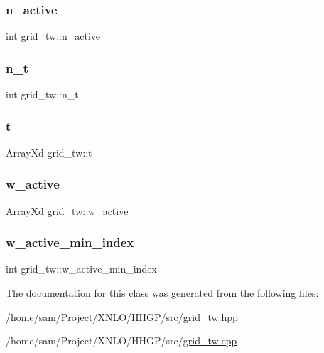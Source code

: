 \subsubsection{\texorpdfstring{n\+\_\+active}{n\_active}}
{\footnotesize\ttfamily int grid\+\_\+tw\+::n\+\_\+active}

\mbox{\label{classgrid__tw_ac121ce740479f628bdaa54627540ad42}} 
\subsubsection{\texorpdfstring{n\+\_\+t}{n\_t}}
{\footnotesize\ttfamily int grid\+\_\+tw\+::n\+\_\+t}

\mbox{\label{classgrid__tw_a918f1e6d18056d0f6da08fe01089b9b0}} 
\subsubsection{\texorpdfstring{t}{t}}
{\footnotesize\ttfamily Array\+Xd grid\+\_\+tw\+::t}

\mbox{\label{classgrid__tw_a66922766c9dfe5c4667e55e678b134b9}} 
\subsubsection{\texorpdfstring{w\+\_\+active}{w\_active}}
{\footnotesize\ttfamily Array\+Xd grid\+\_\+tw\+::w\+\_\+active}

\mbox{\label{classgrid__tw_a27d987fb3c8cbacf9cd152b83477f0d9}} 
\subsubsection{\texorpdfstring{w\+\_\+active\+\_\+min\+\_\+index}{w\_active\_min\_index}}
{\footnotesize\ttfamily int grid\+\_\+tw\+::w\+\_\+active\+\_\+min\+\_\+index}



The documentation for this class was generated from the following files\+:\begin{DoxyCompactItemize}
\item 
/home/sam/\+Project/\+X\+N\+L\+O/\+H\+H\+G\+P/src/\hyperlink{grid__tw_8hpp}{grid\+\_\+tw.\+hpp}\item 
/home/sam/\+Project/\+X\+N\+L\+O/\+H\+H\+G\+P/src/\hyperlink{grid__tw_8cpp}{grid\+\_\+tw.\+cpp}\end{DoxyCompactItemize}
